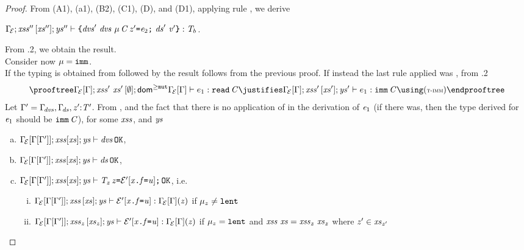 {\begin{proof}
From (A1), (a1), (B2), (C1),  (D), and (D1), applying rule , we derive
\begin{center}
$\AuxTypeCheck{{\TypeEnv{\ctx}}}{\LentLocked''}{\MutGroup''}{\StronglyLocked''}{\Block{\dvs'\ \dvs\ \Dec{\Type{\mu}{\C}}{\z'}{\e_2}\ \decs'}{\val'}}{\T_b}$.
\end{center}
From .2, we obtain the result.\\
Consider now \underline{$\mu=\texttt{imm}$}.\\
If the typing is obtained from  followed by  the result follows from the
previous proof. If instead the last rule applied was , from .2 
\[
\prooftree
\AuxTypeCheck{{\SubstFun{\TypeEnv{\ctx}}{\Gamma}}}{\LentLocked'\ \xs'}{\emptyset}{\domGeqMut{\SubstFun{\TypeEnv{\ctx}}{\Gamma}}}{e_1}{\Type{\readable}{\C}}
\justifies
\AuxTypeCheck{{\SubstFun{\TypeEnv{\ctx}}{\Gamma}}}{\LentLocked'}{\MutGroup'}{\StronglyLocked'}{e_1}{\Type{\imm}{\C}}
\using
\rn{t-imm}
\endprooftree
\]
Let
$\Gamma'=\Gamma_{\!\mathit{dvs}},\Gamma_{\!\mathit{ds}},\mathit{z}'{:}\mathit{T}'$.  From , and the fact that
there is no application of  in the derivation of $\mathit{e}_1$ (if there was, then  the type derived for $\mathit{e}_1$ should be $\texttt{imm}\,\mathit{C}$), for some $\mathit{xss}$, and $\mathit{ys}$ 
\begin{enumerate} [(a)]
\item ${\Gamma_{\!{\cal{E}}}[\Gamma[\Gamma']]};\mathit{xss}[\mathit{xs}];\mathit{ys}\vdash \mathit{dvs}\,{\tt OK}$,
\item ${\Gamma_{\!{\cal{E}}}[\Gamma[\Gamma']]};\mathit{xss}[\mathit{xs}];\mathit{ys}\vdash \mathit{ds}\,{\tt OK}$,
\item ${\Gamma_{\!{\cal{E}}}[\Gamma[\Gamma']]};\mathit{xss}[\mathit{xs}];\mathit{ys}\vdash \mathit{T}_z\,\mathit{z}\texttt{=}{\cal{E}'}[\mathit{x}\texttt{.}\mathit{f}\texttt{=}\mathit{u}]\texttt{;}\,{\tt OK}$, i.e.
\begin{enumerate}[i.]
\item ${\Gamma_{\!{\cal{E}}}[\Gamma[\Gamma']]};\mathit{xss}\,[\mathit{xs}];\mathit{ys}\vdash {\cal{E}'}[\mathit{x}\texttt{.}\mathit{f}\texttt{=}\mathit{u}]:{\Gamma_{\!{\cal{E}}}[\Gamma]}(\mathit{z})$ if $\mu_z\neq\texttt{lent}$
\item ${\Gamma_{\!{\cal{E}}}[\Gamma[\Gamma']]};\mathit{xss}_{\mathit{z}}\,[\mathit{xs}_{\mathit{z}}];\mathit{ys}\vdash {\cal{E}'}[\mathit{x}\texttt{.}\mathit{f}\texttt{=}\mathit{u}]:{\Gamma_{\!{\cal{E}}}[\Gamma]}(\mathit{z})$ if $\mu_z=\texttt{lent}$ and $\mathit{xss}\ \mathit{xs}=\mathit{xss}_{\mathit{z}}\ \mathit{xs}_{\mathit{z}}$ where $\mathit{z}'\in\mathit{xs}_{\mathit{z}'}$

\end{enumerate}
\end{enumerate}
\end{proof}}
